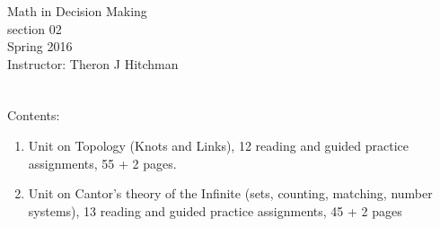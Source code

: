\documentclass[12pt]{article}
\begin{document}
\thispagestyle{empty}

\begin{center}
{\Huge Math in Decision Making\\ section 02}\\[1in]
{\Large Spring 2016}\\[.5in] 
{\Large Instructor: Theron J Hitchman}
\end{center}



\clearpage
\thispagestyle{empty}
$\phantom{Theron J Hitchman}$
\newpage

{\Large
Contents:
\begin{enumerate}
\item Unit on Topology (Knots and Links), 12 reading and guided practice assignments, 55 + 2 pages.

\item Unit on Cantor's theory of the Infinite (sets, counting, matching, number systems), 13 reading and guided practice assignments, 45 + 2 pages
\end{enumerate}
}
\newpage
$\phantom{Theron J Hitchman}$
\newpage


$\phantom{Theron J Hitchman}$
\newpage

\end{document}

